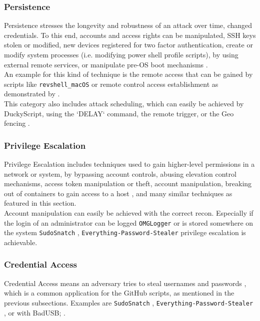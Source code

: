 \subsubsection{Persistence} \label{persistence}

Persistence stresses the longevity and robustness of an attack over time, changed credentials. To this end, accounts and access rights can be manipulated, SSH keys stolen or modified, new devices registered for two factor authentication, create or modify system processes (i.e. modifying power shell profile scripts), by using external remote services, or manipulate pre-OS boot mechanisms \cite{MITREATTCK}. \\
An example for this kind of technique is the remote access that can be gained by scripts like \verb|revshell_macOS| \cite{OmgpayloadsPayloadsLibrary} or remote control access establishment as demonstrated by \cite{bojovicRisingThreatHardware2019}. \\
This category also includes attack scheduling, which can easily be achieved by DuckyScript, using the `DELAY` command, the remote trigger, or the Geo fencing \cite{hak5MGCable}.

\subsubsection{Privilege Escalation}

Privilege Escalation includes techniques used to gain higher-level permissions in a network or system, by bypassing account controls, abusing elevation control mechanisms, access token manipulation or theft, account manipulation, breaking out of containers to gain access to a host \cite{MITREATTCK}, and many similar techniques as featured in this section. \\
Account manipulation can easily be achieved with the correct recon. Especially if the login of an administrator can be logged \verb|OMGLogger| \cite{OmgpayloadsPayloadsLibrary} or is stored somewhere on the system \verb|SudoSnatch| \cite{OmgpayloadsPayloadsLibrary}, \verb|Everything-Password-Stealer| \cite{OmgpayloadsPayloadsLibrary} privilege escalation is achievable.

\subsubsection{Credential Access}

Credential Access means an adversary tries to steal usernames and passwords \cite{MITREATTCK}, which is a common application for the GitHub scripts, as mentioned in the previous subsections. Examples are \verb|SudoSnatch| \cite{OmgpayloadsPayloadsLibrary}, \verb|Everything-Password-Stealer| \cite{OmgpayloadsPayloadsLibrary}, or with BadUSB;  \cite{muslimImplementationAnalysisUSB2020}. 


